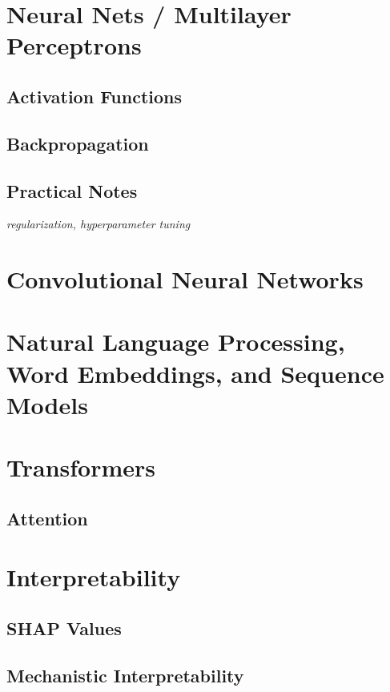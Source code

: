 \documentclass[../../../main.tex]{subfiles}
\begin{document}

\section{Neural Nets / Multilayer Perceptrons}
\subsection{Activation Functions}
\subsection{Backpropagation}
\subsection{Practical Notes}
\textit{regularization, hyperparameter tuning}
\section{Convolutional Neural Networks}
\section{Natural Language Processing, Word Embeddings, and Sequence Models}
\section{Transformers}
\subsection{Attention}
\section{Interpretability}
\subsection{SHAP Values}
\subsection{Mechanistic Interpretability}

\printbibliography[
    heading=subbibintoc,
    title={References}
]
\end{document}
